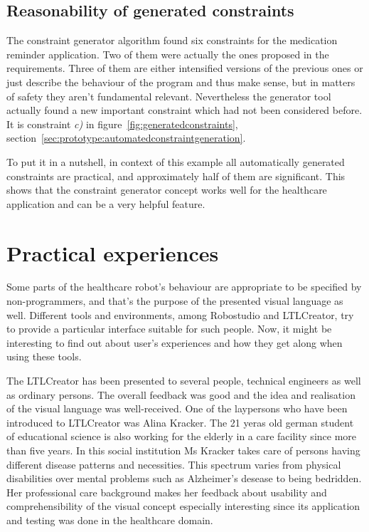 \subsection{Reasonability of generated constraints}

The constraint generator algorithm found six constraints for the medication reminder application. Two of them were actually the ones proposed in the requirements. Three of them are either intensified versions of the previous ones or just describe the behaviour of the program and thus make sense, but in matters of safety they aren't fundamental relevant.
Nevertheless the generator tool actually found a new important constraint which had not been considered before. It is constraint \emph{c)} in figure~\ref{fig:generatedconstraints}, section~\ref{sec:prototype:automatedconstraintgeneration}.

To put it in a nutshell, in context of this example all automatically generated constraints are practical, and approximately half of them are significant. This shows that the constraint generator concept works well for the healthcare application and can be a very helpful feature.




\section{Practical experiences}
\label{sec:practicalexperiences}

Some parts of the healthcare robot's behaviour are appropriate to be specified by non-programmers, and that's the purpose of the presented visual language as well. Different tools and environments, among Robostudio and LTLCreator, try to provide a particular interface suitable for such people. Now, it might be interesting to find out about user's experiences and how they get along when using these tools.

The LTLCreator has been presented to several people, technical engineers as well as ordinary persons. The overall feedback was good and the idea and realisation of the visual language was well-received. One of the laypersons who have been introduced to LTLCreator was Alina Kracker. The 21 yeras old german student of educational science is also working for the elderly in a care facility since more than five years. In this social institution Ms Kracker takes care of persons having different disease patterns and necessities. This spectrum varies from physical disabilities over mental problems such as Alzheimer's desease to being bedridden.
Her professional care background makes her feedback about usability and comprehensibility of the visual concept especially interesting since its application and testing was done in the healthcare domain.

